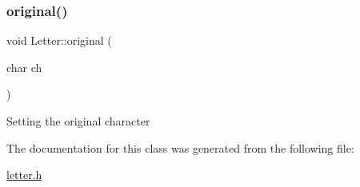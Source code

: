 \subsubsection{\texorpdfstring{original()}{original()}\hspace{0.1cm}{\footnotesize\ttfamily [2/2]}}
{\footnotesize\ttfamily void Letter\+::original (\begin{DoxyParamCaption}\item[{char}]{ch }\end{DoxyParamCaption})\hspace{0.3cm}{\ttfamily [inline]}}

Setting the original character 

The documentation for this class was generated from the following file\+:\begin{DoxyCompactItemize}
\item 
\hyperlink{letter_8h}{letter.\+h}\end{DoxyCompactItemize}
